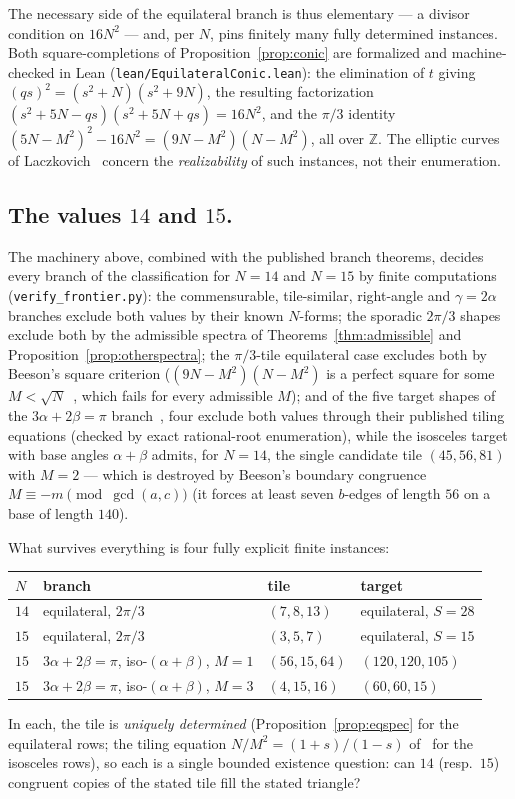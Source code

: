 \documentclass[11pt,reqno]{amsart}
\theoremstyle{plain}
\theoremstyle{definition}
\newcommand{\Z}{\mathbb{Z}}
\begin{document}
\noindent The necessary side of the equilateral branch is thus elementary --- a divisor
condition on $16N^2$ --- and, per $N$, pins finitely many fully determined instances. Both
square-completions of Proposition~\ref{prop:conic} are formalized and machine-checked in Lean
(\texttt{lean/EquilateralConic.lean}): the elimination of $t$ giving $(qs)^2=(s^2+N)(s^2+9N)$, the
resulting factorization $(s^2+5N-qs)(s^2+5N+qs)=16N^2$, and the $\pi/3$ identity
$(5N-M^2)^2-16N^2=(9N-M^2)(N-M^2)$, all over $\Z$. The elliptic curves of
Laczkovich~\cite{LaczkovichEll} concern the \emph{realizability} of such instances, not their
enumeration.

\subsection*{The values $14$ and $15$.}\label{sub:frontier}
The machinery above, combined with the published branch theorems, decides every branch of the
classification for $N=14$ and $N=15$ by finite computations
(\texttt{verify\_frontier.py}): the commensurable, tile-similar, right-angle and
$\gamma=2\alpha$ branches exclude both values by their known $N$-forms; the sporadic
$2\pi/3$ shapes exclude both by the admissible spectra of
Theorems~\ref{thm:admissible} and Proposition~\ref{prop:otherspectra}; the $\pi/3$-tile equilateral
case excludes both by Beeson's square criterion ($(9N-M^2)(N-M^2)$ is a perfect square for some
$M<\sqrt N$~\cite[Thm.~3]{BeesonEq}, which fails for every admissible $M$); and of the five target
shapes of the $3\alpha+2\beta=\pi$ branch~\cite{BeesonIII}, four exclude both values through their
published tiling equations (checked by exact rational-root enumeration), while the isosceles target
with base angles $\alpha+\beta$ admits, for $N=14$, the single candidate tile $(45,56,81)$ with
$M=2$ --- which is destroyed by Beeson's boundary congruence $M\equiv-m\pmod{\gcd(a,c)}$ (it forces
at least seven $b$-edges of length $56$ on a base of length $140$).

What survives everything is four fully explicit finite instances:
\begin{center}
\begin{tabular}{llll}
$N$ & branch & tile & target\\
\hline
$14$ & equilateral, $2\pi/3$ & $(7,8,13)$ & equilateral, $S=28$\\
$15$ & equilateral, $2\pi/3$ & $(3,5,7)$ & equilateral, $S=15$\\
$15$ & $3\alpha+2\beta=\pi$, iso-$(\alpha{+}\beta)$, $M=1$ & $(56,15,64)$ & $(120,120,105)$\\
$15$ & $3\alpha+2\beta=\pi$, iso-$(\alpha{+}\beta)$, $M=3$ & $(4,15,16)$ & $(60,60,15)$\\
\end{tabular}
\end{center}
In each, the tile is \emph{uniquely determined} (Proposition~\ref{prop:eqspec} for the equilateral
rows; the tiling equation $N/M^2=(1+s)/(1-s)$ of~\cite[Thm.~17]{BeesonIII} for the isosceles rows),
so each is a single bounded existence question: can $14$ (resp.\ $15$) congruent copies of the
stated tile fill the stated triangle?
\end{document}
